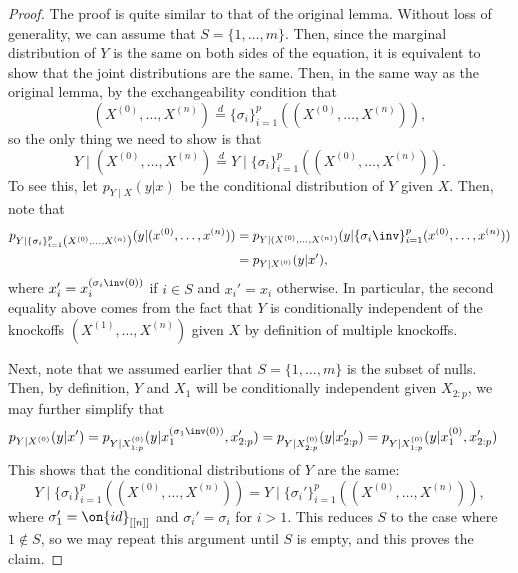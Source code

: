 \documentclass[11pt,reqno]{report}
\theoremstyle{definition}
\numberwithin{equation}{section}
\begin{document}
\begin{proof}
The proof is quite similar to that of the original lemma. Without loss of generality, we can assume that $S = \{ 1, \ldots, m \}$. Then, since the marginal distribution of $Y$ is the same on both sides of the equation, it is equivalent to show that the joint distributions are the same. Then, in the same way as the original lemma, by the exchangeability condition that \[ (X^{(0)}, \ldots, X^{(n)}) \overset{d}= \{ \sigma_i \}_{i=1}^p \left( (X^{(0)}, \ldots, X^{(n)}) \right),\] so the only thing we need to show is that 
\begin{equation}
Y \mid (X^{(0)}, \ldots, X^{(n)}) \overset{d}= Y \mid \{ \sigma_i \}_{i=1}^p \left( (X^{(0)}, \ldots, X^{(n)}) \right).
\end{equation}
To see this, let $p_{Y \mid X}(y|x)$ be the conditional distribution of $Y$ given $X$. Then, note that
\begin{align*}
p_{Y \mid \{ \sigma_i \}_{i=1}^p \left( X^{(0)}, \ldots, X^{(n)} \right)}(y | (x^{(0)}, \ldots , x^{(n)})) &= p_{Y \mid (X^{(0)}, \ldots, X^{(n)})} (y| \{ \sigma_i\inv \}_{i=1}^p (x^{(0)}, \ldots, x^{(n)}) ) \\
&= p_{Y \mid X^{(0)}} (y| x'),
\end{align*}
where $x_i' = x^{(\sigma_i\inv(0))}_i$ if $i \in S$ and $x_i' = x_i$ otherwise. In particular, the second equality above comes from the fact that $Y$ is conditionally independent of the knockoffs $(X^{(1)}, \ldots, X^{(n)})$ given $X$ by definition of multiple knockoffs.

Next, note that we assumed earlier that $S = \{ 1, \ldots, m \}$ is the subset of nulls. Then, by definition, $Y$ and $X_1$ will be conditionally independent given $X_{2 : p}$, we may further simplify that
\begin{align*}
p_{Y \mid X^{(0)}} (y| x') &= p_{Y \mid X^{(0)}_{1 : p}} (y | x^{(\sigma_1\inv(0))}_1, x'_{2 : p}) = p_{Y \mid X^{(0)}_{2 : p}} (y | x'_{2 : p}) = p_{Y \mid X^{(0)}_{1 : p}} (y | x_1^{(0)}, x'_{2 : p})
\end{align*}
This shows that the conditional distributions of $Y$ are the same:
\[ Y \mid \{ \sigma_i \}_{i=1}^p \left( (X^{(0)}, \ldots, X^{(n)}) \right) = Y \mid \{ \sigma_i' \}_{i=1}^p \left( (X^{(0)}, \ldots, X^{(n)}) \right), \] where $\sigma_1' = \on{id}_{[[n]]}$ and $\sigma_i' = \sigma_i$ for $i  > 1$. This reduces $S$ to the case where $1 \not \in S$, so we may repeat this argument until $S$ is empty, and this proves the claim.
\end{proof}
\end{document}

